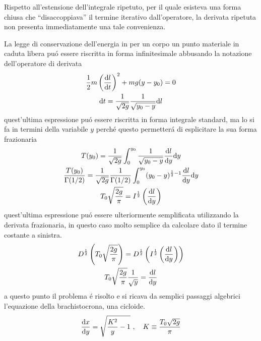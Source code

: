 \begin{multicols}{3}
  Rispetto all'estensione dell'integrale ripetuto, per il quale esisteva una forma chiusa che
  ``disaccoppiava'' il termine iterativo dall'operatore, la derivata ripetuta non presenta
  immediatamente una tale convenienza.
  
  La legge di conservazione dell'energia in per un corpo un punto materiale in caduta libera pu\'o essere
  riscritta in forma infinitesimale abbusando la notazione dell'operatore di derivata
  \begin{equation}
    \begin{gathered}
      \frac{1}{2}m\left(\dv{l}{t}\right)^2 + mg(y-y_0) = 0 \\
      \text{d}t = \frac{1}{\sqrt{2g}}\frac{1}{\sqrt{y_0 - y}}\text{d}l
    \end{gathered}
  \end{equation}
  quest'ultima espressione pu\'o essere riscritta in forma integrale standard, ma lo si fa in termini della
  variabile $y$ perch\'e questo permetter\'a di esplicitare la sua forma frazionaria
  \begin{equation}
    \begin{gathered}
      T(y_0) = \frac{1}{\sqrt{2g}} \int_{0}^{y_0} \frac{1}{\sqrt{y_0 - y}}\dv{l}{y}\text{d}y \\
      \frac{T(y_0)}{\Gamma(1/2)} = \frac{1}{\sqrt{2g}}\frac{1}{\Gamma(1/2)}\int_{0}^{y_0} (y_0 - y)^{\frac{1}{2}-1}\dv{l}{y}\text{d}y \\
      T_0\sqrt{\frac{2g}{\pi}} = I^{\frac{1}{2}}\left(\dv{l}{y}\right)
    \end{gathered}
  \end{equation}
  quest'ultima espressione pu\'o essere ulteriormente semplificata utilizzando la derivata frazionaria,
  in questo caso molto semplice da calcolare dato il termine costante a sinistra.
  \begin{equation}
    \begin{gathered}
      D^{\frac{1}{2}}\left(T_0\sqrt{\frac{2g}{\pi}}\right) = D^{\frac{1}{2}}\left(I^{\frac{1}{2}}\left(\dv{l}{y}\right)\right) \\
      T_0\sqrt{\frac{2g}{\pi}}\frac{1}{\sqrt{y}} = \dv{l}{y} \\
    \end{gathered}
  \end{equation}
  a questo punto il problema \'e risolto e si ricava da semplici passaggi algebrici l'equazione della brachistocrona, una cicloide.
  \begin{equation}
    \dv{x}{y} = \sqrt{\frac{K^2}{y} - 1} ~, \quad K \equiv \frac{T_0\sqrt{2g}}{\pi}
  \end{equation}

\end{multicols}



